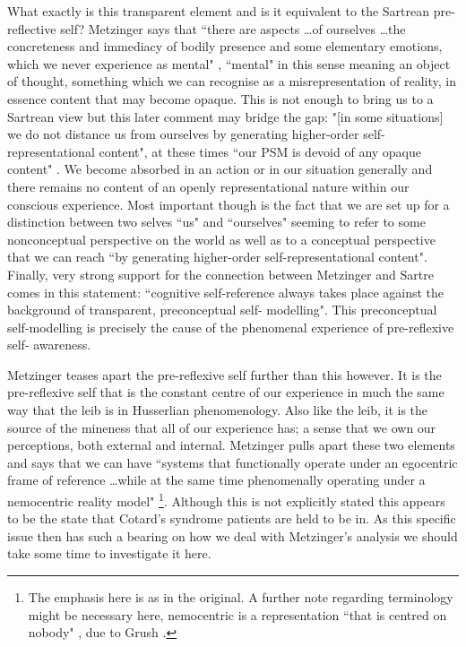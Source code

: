 What exactly is this transparent element and is it equivalent to the Sartrean pre-reflective self? Metzinger says that ``there are aspects \ldots of ourselves \ldots the concreteness and immediacy of bodily presence and some elementary emotions, which we never experience as mental" \cite[p. 332]{metzinger2003}, ``mental" in this sense meaning an object of thought, something which we can recognise as a misrepresentation of reality, in essence content that may become opaque. This is not enough to bring us to a Sartrean view but this later comment may bridge the gap: "[in some situations] we do not distance us from ourselves by generating higher-order self-representational content", at these times ``our PSM is devoid of any opaque content" \cite[p. 333]{metzinger2003}. We become absorbed in an action or in our situation generally and there remains no content of an openly representational nature within our conscious experience. Most important though is the fact that we are set up for a distinction between two selves ``us" and ``ourselves" seeming to refer to some nonconceptual perspective on the world as well as to a conceptual perspective that we can reach ``by generating higher-order self-representational content". Finally, very strong support for the connection between Metzinger and Sartre comes in this statement: ``cognitive self-reference always takes place against the background of transparent, preconceptual self- modelling". This preconceptual self-modelling is precisely the cause of the phenomenal experience of pre-reflexive self- awareness.

Metzinger teases apart the pre-reflexive self further than this however. It is the pre-reflexive self that is the constant centre of our experience in much the same way that the leib is in Husserlian phenomenology. Also like the leib, it is the source of the mineness that all of our experience has; a sense that we own our perceptions, both external and internal. Metzinger pulls apart these two elements and says that we can have ``systems that functionally operate under an egocentric frame of reference \ldots while at the same time phenomenally operating under a nemocentric reality model" \cite[p. 336]{metzinger2003}\footnote{The emphasis here is as in the original. A further note regarding terminology might be necessary here, nemocentric is a representation ``that is centred on nobody" \cite[p. 336 (footnote)]{metzinger2003}, due to Grush \cite{grush2000}.}. Although this is not explicitly stated this appears to be the state that Cotard's syndrome patients are held to be in. As this specific issue then has such a bearing on how we deal with Metzinger's analysis we should take some time to investigate it here.

